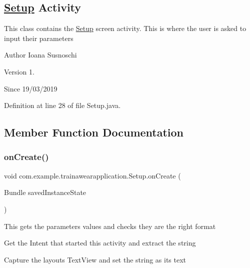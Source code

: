 \subsection*{\mbox{\hyperlink{classcom_1_1example_1_1trainawearapplication_1_1_setup}{Setup}} Activity}

This class contains the \mbox{\hyperlink{classcom_1_1example_1_1trainawearapplication_1_1_setup}{Setup}} screen activity. This is where the user is asked to input their parameters

\begin{DoxyAuthor}{Author}
Ioana Susnoschi 
\end{DoxyAuthor}
\begin{DoxyVersion}{Version}
1. 
\end{DoxyVersion}
\begin{DoxySince}{Since}
19/03/2019 
\end{DoxySince}


Definition at line 28 of file Setup.\+java.



\subsection{Member Function Documentation}
\mbox{\label{classcom_1_1example_1_1trainawearapplication_1_1_setup_a52f522c34d14c93dbf7f75ff75ce606d}} 
\subsubsection{\texorpdfstring{onCreate()}{onCreate()}}
{\footnotesize\ttfamily void com.\+example.\+trainawearapplication.\+Setup.\+on\+Create (\begin{DoxyParamCaption}\item[{Bundle}]{saved\+Instance\+State }\end{DoxyParamCaption})\hspace{0.3cm}{\ttfamily [protected]}}

This gets the parameters values and checks they are the right format

Get the Intent that started this activity and extract the string

Capture the layout\textquotesingle{}s Text\+View and set the string as its text

